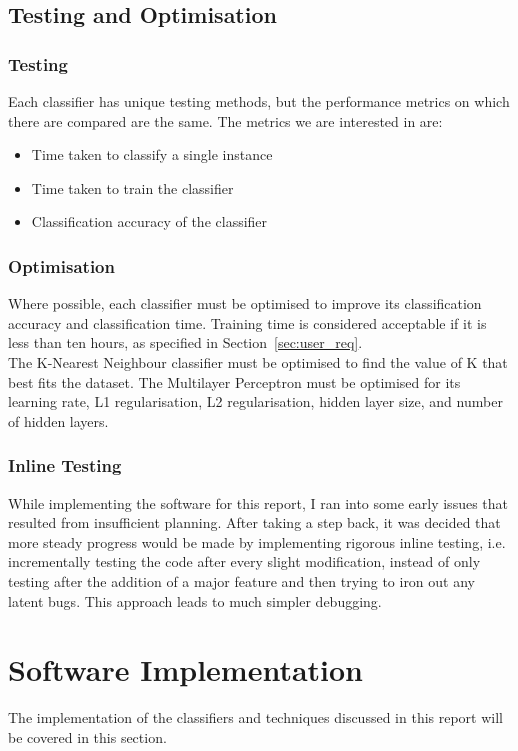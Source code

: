 \subsection{Testing and Optimisation}
\subsubsection{Testing}
Each classifier has unique testing methods, but the performance metrics on which there are compared are the same. The metrics we are interested in are:
\begin{itemize}
	\item Time taken to classify a single instance
	\item Time taken to train the classifier
	\item Classification accuracy of the classifier
\end{itemize}

\subsubsection{Optimisation}
Where possible, each classifier must be optimised to improve its classification accuracy and classification time. Training time is considered acceptable if it is less than ten hours, as specified in Section~\ref{sec:user_req}. \\

The K-Nearest Neighbour classifier must be optimised to find the value of K that best fits the dataset.
The Multilayer Perceptron must be optimised for its learning rate, L1 regularisation, L2 regularisation, hidden layer size, and number of hidden layers.

\subsubsection{Inline Testing}
While implementing the software for this report, I ran into some early issues that resulted from insufficient planning. After taking a step back, it was decided that more steady progress would be made by implementing rigorous inline testing, i.e. incrementally testing the code after every slight modification, instead of only testing after the addition of a major feature and then trying to iron out any latent bugs. This approach leads to much simpler debugging.


\section{Software Implementation}
The implementation of the classifiers and techniques discussed in this report will be covered in this section. 



